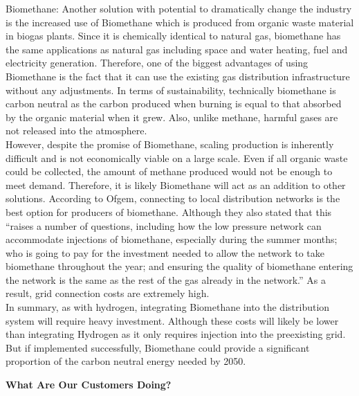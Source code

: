 \documentclass[11pt]{article}		%
\begin{document}
        Biomethane: 
        Another solution with potential to dramatically change the industry is the increased use of Biomethane which is produced from organic waste material in biogas plants. Since it is chemically identical to natural gas, biomethane has the same applications as natural gas including space and water heating, fuel and electricity generation. Therefore, one of the biggest advantages of using Biomethane is the fact that it can use the existing gas distribution infrastructure without any adjustments. In terms of sustainability, technically biomethane is carbon neutral as the carbon produced when burning is equal to that absorbed by the organic material when it grew. Also, unlike methane, harmful gases are not released into the atmosphere.\\
	    \hspace*{3ex}However, despite the promise of Biomethane, scaling production is inherently difficult and is not economically viable on a large scale. Even if all organic waste could be collected, the amount of methane produced would not be enough to meet demand. Therefore, it is likely Biomethane will act as an addition to other solutions. According to Ofgem, connecting to local distribution networks is the best option for producers of biomethane. Although they also stated that this “raises a number of questions, including how the low pressure network can accommodate injections of biomethane, especially during the summer months; who is going to pay for the investment needed to allow the network to take biomethane throughout the year; and ensuring the quality of biomethane entering the network is the same as the rest of the gas already in the network.” As a result, grid connection costs are extremely high.\\
    	\hspace*{3ex}In summary, as with hydrogen, integrating Biomethane into the distribution system will require heavy investment. Although these costs will likely be lower than integrating Hydrogen as it only requires injection into the preexisting grid. But if implemented successfully, Biomethane could provide a significant proportion of the carbon neutral energy needed by 2050.

		\textbf{What Are Our Customers Doing?}\\
		
\end{document}
